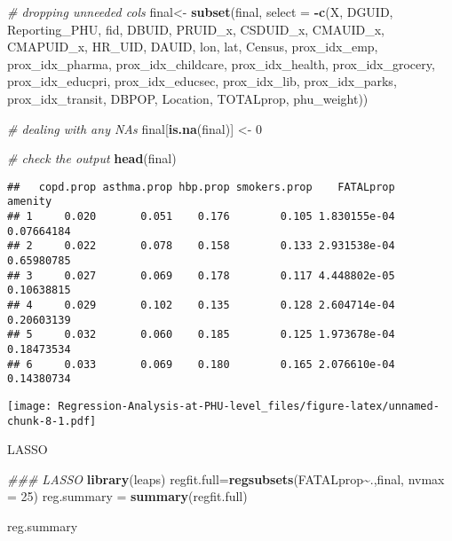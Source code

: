 \documentclass[]{article}
\newenvironment{Shaded}{\begin{snugshade}}{\end{snugshade}}
\newcommand{\CommentTok}[1]{\textcolor[rgb]{0.56,0.35,0.01}{\textit{#1}}}
\newcommand{\DataTypeTok}[1]{\textcolor[rgb]{0.13,0.29,0.53}{#1}}
\newcommand{\DecValTok}[1]{\textcolor[rgb]{0.00,0.00,0.81}{#1}}
\newcommand{\KeywordTok}[1]{\textcolor[rgb]{0.13,0.29,0.53}{\textbf{#1}}}
\newcommand{\NormalTok}[1]{#1}
\newcommand{\OperatorTok}[1]{\textcolor[rgb]{0.81,0.36,0.00}{\textbf{#1}}}
\newcommand{\StringTok}[1]{\textcolor[rgb]{0.31,0.60,0.02}{#1}}
\begin{document}
\begin{Shaded}
\begin{Highlighting}[]
\CommentTok{\# dropping unneeded cols}
\NormalTok{final\textless{}{-}}\StringTok{ }\KeywordTok{subset}\NormalTok{(final, }\DataTypeTok{select =} \OperatorTok{{-}}\KeywordTok{c}\NormalTok{(X, DGUID, Reporting\_PHU, fid, DBUID, PRUID\_x, CSDUID\_x, CMAUID\_x, CMAPUID\_x, HR\_UID, DAUID, lon, lat, Census, prox\_idx\_emp, prox\_idx\_pharma, prox\_idx\_childcare, prox\_idx\_health, prox\_idx\_grocery, prox\_idx\_educpri, prox\_idx\_educsec, prox\_idx\_lib, prox\_idx\_parks, prox\_idx\_transit, DBPOP, Location, TOTALprop, phu\_weight))}
 
\CommentTok{\# dealing with any NA\textquotesingle{}s}
\NormalTok{final[}\KeywordTok{is.na}\NormalTok{(final)] \textless{}{-}}\StringTok{ }\DecValTok{0}

\CommentTok{\# check the output}
\KeywordTok{head}\NormalTok{(final)}
\end{Highlighting}
\end{Shaded}

\begin{verbatim}
##   copd.prop asthma.prop hbp.prop smokers.prop    FATALprop    amenity
## 1     0.020       0.051    0.176        0.105 1.830155e-04 0.07664184
## 2     0.022       0.078    0.158        0.133 2.931538e-04 0.65980785
## 3     0.027       0.069    0.178        0.117 4.448802e-05 0.10638815
## 4     0.029       0.102    0.135        0.128 2.604714e-04 0.20603139
## 5     0.032       0.060    0.185        0.125 1.973678e-04 0.18473534
## 6     0.033       0.069    0.180        0.165 2.076610e-04 0.14380734
\end{verbatim}

\begin{Shaded}
\end{Shaded}

\texttt{[image: Regression-Analysis-at-PHU-level\_files/figure-latex/unnamed-chunk-8-1.pdf]}

LASSO

\begin{Shaded}
\begin{Highlighting}[]
\CommentTok{\#\#\# LASSO}
\KeywordTok{library}\NormalTok{(leaps)}
\NormalTok{regfit.full=}\KeywordTok{regsubsets}\NormalTok{(FATALprop}\OperatorTok{\textasciitilde{}}\NormalTok{.,final, }\DataTypeTok{nvmax =} \DecValTok{25}\NormalTok{)}
\NormalTok{reg.summary =}\StringTok{ }\KeywordTok{summary}\NormalTok{(regfit.full)}

\NormalTok{reg.summary}
\end{Highlighting}
\end{Shaded}
\end{document}

